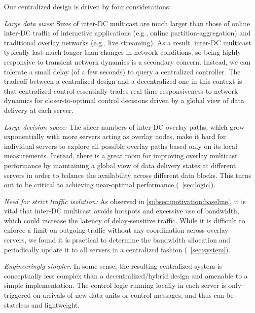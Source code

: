 Our centralized design is driven by four
considerations:
\begin{packedenumerate}
\item {\em Large data sizes:}
Sizes of inter-DC multicast are much larger
than those of online inter-DC traffic of interactive applications
(e.g., online partition-aggregation) and
traditional overlay networks (e.g., live streaming).
As a result, inter-DC multicast typically
last much longer than changes in
network conditions, so being highly responsive
to transient network dynamics is a secondary concern.
Instead, we can tolerate a small delay (of a few seconds)
to query a centralized controller.
The tradeoff between a centralized design and a decentralized one
in this context is that centralized control essentially trades
real-time responsiveness to network dynamics for
closer-to-optimal control decisions driven by
a global view of data delivery at each server.
\item {\em Large decision space:}
The sheer numbers of inter-DC overlay paths,
which grow exponentially with more servers acting as overlay nodes,
make it hard for individual servers to explore all possible overlay
paths based only on its local measurements.
Instead, there is a great room for improving overlay multicast
performance by maintaining a global view of data delivery states at
different servers in order to balance the availability across
different data blocks.
This turns out to be critical to achieving near-optimal performance
(\Section~\ref{sec:logic}).
\item {\em Need for strict traffic isolation:}
As observed in \Section\ref{subsec:motivation:baseline}, it is vital that inter-DC
multicast avoids hotspots and excessive use of
bandwidth, which could increase the latency of delay-sensitive traffic.
While it is difficult to enforce a limit on outgoing traffic
without any coordination across overlay servers, we found it is practical
to determine the bandwidth allocation and periodically update it
to all servers in a centralized fashion (\Section~\ref{sec:system}).
\item {\em Engineeringly simpler:}
In some sense, the resulting centralized system is conceptually
less complex than a decentralized/hybrid design
and amenable to a simple implementation.
The control logic running locally in each server
is only triggered on arrivals of new data units or control messages,
and thus can be stateless and lightweight.

\end{packedenumerate}


